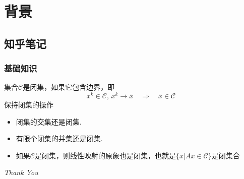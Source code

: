 \documentclass[UTF8, aspectratio=169, 9pt]{ctexbeamer}
\begin{document}
\section{背景}
\subsection{知乎笔记}
\begin{frame}
  \frametitle{基础知识}
  集合$\mathcal{C}$是闭集，如果它包含边界，即
  $$
  x^k \in \mathcal{C}, \, x^k \rightarrow \bar{x} \quad \Rightarrow \quad \bar{x}
  \in \mathcal{C}
  $$
  保持闭集的操作
  \begin{itemize}
  \item 闭集的交集还是闭集.
  \item 有限个闭集的并集还是闭集.
  \item 如果$\mathcal{C}$是闭集，则线性映射的原象也是闭集，也就是$\{ x|Ax \in
    \mathcal{C} \}$是闭集合
  \end{itemize}
\end{frame}

\thispagestyle{empty} 
\begin{frame}{}
  \centering \Huge
  \emph{Thank You}
\end{frame}
\end{document}
